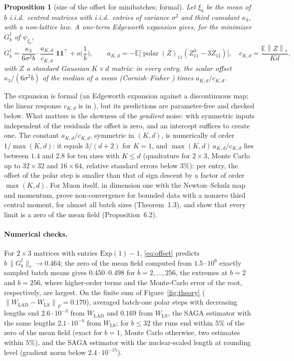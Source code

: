 \documentclass[10pt]{article}
\newtheorem{proposition}[theorem]{Proposition}
\newcommand{\E}{\mathbb{E}}
\newcommand{\nnuc}[1]{\left\|#1\right\|_{*}}
\newcommand{\nF}[1]{\left\|#1\right\|_{F}}
\newcommand{\polar}{\operatorname{polar}}
\newcommand{\ones}{\mathbf{1}}
\begin{document}
\begin{proposition}[size of the offset for minibatches; formal]\label{prop:offset}
Let $\xi_b$ be the mean of $b$ i.i.d.\ centred matrices with i.i.d.\ entries of variance $\sigma^2$ and third
cumulant $\kappa_3$, with a non-lattice law. A one-term Edgeworth expansion gives, for the minimizer $G_b^\dagger$ of
$\psi_{\xi_b}$,
\begin{equation}\label{eq:offset}
G_b^\dagger=\frac{\kappa_3}{6\sigma^2b}\cdot\frac{a_{K,d}}{c_{K,d}}\;\ones\ones^\top+o\Big(\frac1b\Big),\qquad
a_{K,d}=-\E\big[\polar(Z)_{11}(Z_{11}^3-3Z_{11})\big],\quad c_{K,d}=\frac{\E\nnuc Z}{Kd},
\end{equation}
with $Z$ a standard Gaussian $K\times d$ matrix: in every entry, the scalar offset $\kappa_3/(6\sigma^2b)$ of the
median of a mean (Cornish--Fisher \cite{cornish1938moments}) times $a_{K,d}/c_{K,d}$.
\end{proposition}
The expansion is formal (an Edgeworth expansion against a discontinuous map; the linear response $c_{K,d}$ is in
\cite{xie2026muon,chen2026when}), but its predictions are parameter-free and checked below. What matters is the
skewness of the \emph{gradient} noise: with symmetric inputs independent of the residuals the offset is zero, and an
intercept suffices to create one. The constant $a_{K,d}/c_{K,d}$, symmetric in $(K,d)$, is numerically of order $1/\max(K,d)$:
it equals $3/(d+2)$ for $K=1$, and $\max(K,d)\,a_{K,d}/c_{K,d}$ lies between $1.4$ and $2.8$ for ten sizes with
$K\le d$ (quadrature for $2\times3$, Monte Carlo up to $32\times32$ and $16\times64$, relative standard errors below
$3\%$): per entry, the offset of the polar step is smaller than that of sign descent by a factor of order
$\max(K,d)$. For Muon itself, in dimension one with the Newton--Schulz map and momentum, \cite{do2026muon} prove
non-convergence for bounded data with a nonzero third central moment, for almost all batch sizes (Theorem~1.3), and
show that every limit is a zero of the mean field (Proposition~6.2).

\paragraph{Numerical checks.} For $2\times3$ matrices with entries $\mathrm{Exp}(1)-1$,
\eqref{eq:offset} predicts $b\,\|G_b^\dagger\|_*\to0.464$; the zero of the mean field computed from $1.5\cdot10^6$
exactly sampled batch means gives $0.450$--$0.498$ for $b=2,\dots,256$, the extremes at $b=2$ and $b=256$, where
higher-order terms and the Monte-Carlo error of the root, respectively, are largest. On the finite sum of
Figure~\ref{fig:theory} ($\nF{W_{\mathrm{LAD}}-W_{\mathrm{LS}}}=0.170$), averaged batch-one polar steps with decreasing lengths
end $2.6\cdot10^{-3}$ from $W_{\mathrm{LAD}}$ and $0.169$ from $W_{\mathrm{LS}}$, the SAGA estimator with the same
lengths $2.1\cdot10^{-4}$ from $W_{\mathrm{LS}}$; for $b\le32$ the runs end within $5\%$ of the zero of the mean field
(exact for $b=1$, Monte Carlo otherwise, two estimates within $5\%$), and the SAGA estimator with the nuclear-scaled
length at rounding level (gradient norm below $2.4\cdot10^{-15}$).
\end{document}
